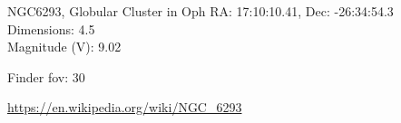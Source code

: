 \begin{block}{NGC6293, Globular Cluster in Oph}
    RA: 17:10:10.41, Dec: -26:34:54.3 \\ 
    Dimensions: 4.5 \\ 
    Magnitude (V): 9.02



    Finder fov: 30 

    \url{https://en.wikipedia.org/wiki/NGC_6293} 
\end{block}